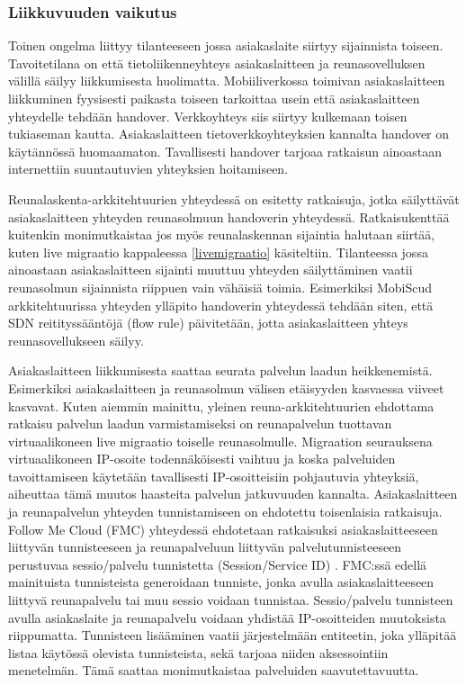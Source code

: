 \subsubsection*{Liikkuvuuden vaikutus}

Toinen ongelma liittyy tilanteeseen jossa asiakaslaite siirtyy sijainnista toiseen. Tavoitetilana on että tietoliikenneyhteys asiakaslaitteen ja reunasovelluksen välillä säilyy liikkumisesta huolimatta.  
Mobiiliverkossa toimivan asiakaslaitteen liikkuminen fyysisesti paikasta toiseen tarkoittaa usein että asiakaslaitteen yhteydelle tehdään handover.
Verkkoyhteys siis siirtyy kulkemaan toisen tukiaseman kautta. 
Asiakaslaitteen tietoverkkoyhteyksien kannalta handover on käytännössä huomaamaton.
Tavallisesti handover tarjoaa ratkaisun ainoastaan internettiin suuntautuvien yhteyksien hoitamiseen.
 

Reunalaskenta-arkkitehtuurien yhteydessä on esitetty ratkaisuja, jotka säilyttävät asiakaslaitteen yhteyden reunasolmuun handoverin yhteydessä. Ratkaisukenttää kuitenkin monimutkaistaa jos myös reunalaskennan sijaintia halutaan siirtää, kuten live migraatio kappaleessa \ref{livemigraatio} käsiteltiin.
Tilanteessa jossa ainoastaan asiakaslaitteen sijainti muuttuu yhteyden säilyttäminen vaatii reunasolmun sijainnista riippuen vain vähäisiä toimia. Esimerkiksi MobiScud arkkitehtuurissa yhteyden ylläpito handoverin yhteydessä tehdään siten, että SDN reitityssääntöjä (flow rule) päivitetään, jotta asiakaslaitteen yhteys reunasovellukseen säilyy. 

Asiakaslaitteen liikkumisesta saattaa seurata palvelun laadun heikkenemistä. Esimerkiksi asiakaslaitteen ja reunasolmun välisen etäisyyden kasvaessa viiveet kasvavat.
Kuten aiemmin mainittu, yleinen reuna-arkkitehtuurien ehdottama ratkaisu palvelun laadun varmistamiseksi on reunapalvelun tuottavan virtuaalikoneen live migraatio toiselle reunasolmulle.
Migraation seurauksena virtuaalikoneen IP-osoite todennäköisesti vaihtuu ja koska palveluiden tavoittamiseen käytetään tavallisesti IP-osoitteisiin pohjautuvia yhteyksiä, aiheuttaa tämä muutos haasteita palvelun jatkuvuuden kannalta.
Asiakaslaitteen ja reunapalvelun yhteyden tunnistamiseen on ehdotettu toisenlaisia ratkaisuja.
Follow Me Cloud (FMC) yhteydessä ehdotetaan ratkaisuksi asiakaslaitteeseen liittyvän tunnisteeseen ja reunapalveluun liittyvän palvelutunnisteeseen perustuvaa sessio/palvelu tunnistetta (Session/Service ID) \cite{taleb2013follow}.
FMC:ssä edellä mainituista tunnisteista generoidaan tunniste, jonka avulla asiakaslaitteeseen liittyvä reunapalvelu tai muu sessio voidaan tunnistaa.
Sessio/palvelu tunnisteen avulla asiakaslaite ja reunapalvelu voidaan yhdistää IP-osoitteiden muutoksista riippumatta.
Tunnisteen lisääminen vaatii järjestelmään entiteetin, joka ylläpitää listaa käytössä olevista tunnisteista, sekä tarjoaa niiden aksessointiin menetelmän. Tämä saattaa monimutkaistaa palveluiden saavutettavuutta. 

